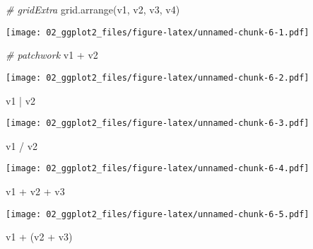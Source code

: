 \documentclass[
]{book}
\newenvironment{Shaded}{\begin{snugshade}}{\end{snugshade}}
\newcommand{\CommentTok}[1]{\textcolor[rgb]{0.56,0.35,0.01}{\textit{#1}}}
\newcommand{\FunctionTok}[1]{\textcolor[rgb]{0.00,0.00,0.00}{#1}}
\newcommand{\NormalTok}[1]{#1}
\newcommand{\SpecialCharTok}[1]{\textcolor[rgb]{0.00,0.00,0.00}{#1}}
\begin{document}
\begin{Shaded}
\begin{Highlighting}[]
\CommentTok{\# gridExtra}
\FunctionTok{grid.arrange}\NormalTok{(v1, v2, v3, v4) }
\end{Highlighting}
\end{Shaded}

\texttt{[image: 02\_ggplot2\_files/figure-latex/unnamed-chunk-6-1.pdf]}

\begin{Shaded}
\begin{Highlighting}[]
\CommentTok{\# patchwork}
\NormalTok{v1 }\SpecialCharTok{+}\NormalTok{ v2}
\end{Highlighting}
\end{Shaded}

\texttt{[image: 02\_ggplot2\_files/figure-latex/unnamed-chunk-6-2.pdf]}

\begin{Shaded}
\begin{Highlighting}[]
\NormalTok{v1 }\SpecialCharTok{|}\NormalTok{ v2}
\end{Highlighting}
\end{Shaded}

\texttt{[image: 02\_ggplot2\_files/figure-latex/unnamed-chunk-6-3.pdf]}

\begin{Shaded}
\begin{Highlighting}[]
\NormalTok{v1 }\SpecialCharTok{/}\NormalTok{ v2}
\end{Highlighting}
\end{Shaded}

\texttt{[image: 02\_ggplot2\_files/figure-latex/unnamed-chunk-6-4.pdf]}

\begin{Shaded}
\begin{Highlighting}[]
\NormalTok{v1 }\SpecialCharTok{+}\NormalTok{ v2 }\SpecialCharTok{+}\NormalTok{ v3}
\end{Highlighting}
\end{Shaded}

\texttt{[image: 02\_ggplot2\_files/figure-latex/unnamed-chunk-6-5.pdf]}

\begin{Shaded}
\begin{Highlighting}[]
\NormalTok{v1 }\SpecialCharTok{+}\NormalTok{ (v2 }\SpecialCharTok{+}\NormalTok{ v3)}
\end{Highlighting}
\end{Shaded}
\end{document}
